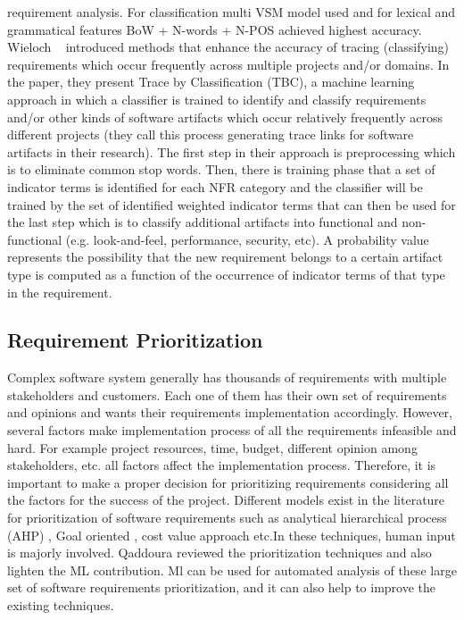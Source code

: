 requirement analysis. For classification multi VSM model used and for lexical
and grammatical features BoW + N-words + N-POS achieved highest accuracy.
Wieloch \etal~\cite{Wieloch:2013} introduced methods that enhance the accuracy
of tracing (classifying) requirements which occur frequently across multiple
projects and/or domains. In the paper, they present Trace by  Classification
(TBC),  a machine learning approach in which a classifier is trained to identify
and classify requirements and/or other kinds of software artifacts which occur
relatively frequently across different projects (they call this process
generating trace links for software artifacts in their research). The first step
in their approach is preprocessing which is to eliminate common stop words.
Then, there is training phase that a set of indicator terms is identified for
each NFR category and the classifier will be trained by the set of identified
weighted indicator terms that can then be used for the last step which is to
classify additional artifacts into functional and non-functional (e.g.
look-and-feel, performance, security, etc). A probability value represents the
possibility that the new requirement belongs to a certain artifact type is
computed as a function of the occurrence of indicator terms of that type in the
requirement.

\subsection{Requirement Prioritization}
Complex software system generally has thousands of requirements with multiple stakeholders and customers. Each one of them has their own set of requirements and opinions and wants their requirements implementation accordingly. However, several factors make implementation process of all the requirements infeasible and hard. For example project resources, time, budget, different opinion among stakeholders, etc. all factors affect the implementation process. Therefore, it is important to make a proper decision for prioritizing requirements considering all the factors for the success of the project. Different models exist in the literature for prioritization of software requirements such as analytical hierarchical process (AHP) \cite{saaty2008}, Goal oriented \cite{VanLamsweerde:2001}, cost value approach \cite{Karlsson:1997} etc.In these techniques, human input is majorly involved. Qaddoura \etal \cite{RQaddoura} reviewed the prioritization techniques and also lighten the ML contribution. Ml can be used for automated analysis of these large set of software requirements prioritization, and it can also help to improve the existing techniques. 

